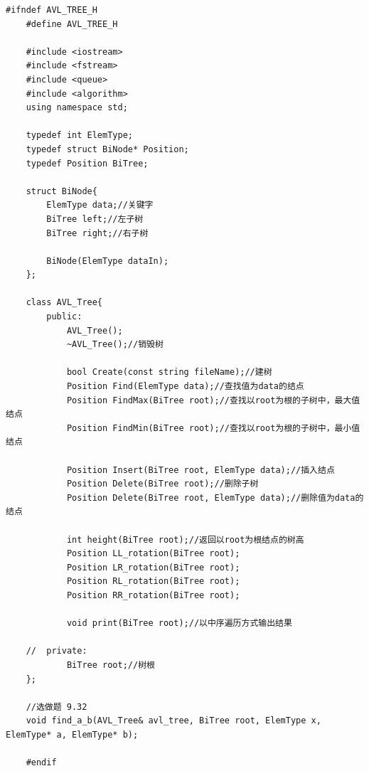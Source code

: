 \documentclass[a4paper,11pt,UTF8]{ctexart}
\begin{document}
\begin{lstlisting}[caption=avl\_tree.h,captionpos=b]
    #ifndef AVL_TREE_H
    #define AVL_TREE_H

    #include <iostream>
    #include <fstream>
    #include <queue>
    #include <algorithm>
    using namespace std;

    typedef int ElemType;
    typedef struct BiNode* Position;
    typedef Position BiTree;

    struct BiNode{
        ElemType data;//关键字
        BiTree left;//左子树
        BiTree right;//右子树

        BiNode(ElemType dataIn);
    };

    class AVL_Tree{
        public:
            AVL_Tree();
            ~AVL_Tree();//销毁树

            bool Create(const string fileName);//建树
            Position Find(ElemType data);//查找值为data的结点
            Position FindMax(BiTree root);//查找以root为根的子树中，最大值结点
            Position FindMin(BiTree root);//查找以root为根的子树中，最小值结点

            Position Insert(BiTree root, ElemType data);//插入结点
            Position Delete(BiTree root);//删除子树
            Position Delete(BiTree root, ElemType data);//删除值为data的结点

            int height(BiTree root);//返回以root为根结点的树高
            Position LL_rotation(BiTree root);
            Position LR_rotation(BiTree root);
            Position RL_rotation(BiTree root);
            Position RR_rotation(BiTree root);

            void print(BiTree root);//以中序遍历方式输出结果

    //	private:
            BiTree root;//树根
    };

    //选做题 9.32
    void find_a_b(AVL_Tree& avl_tree, BiTree root, ElemType x, ElemType* a, ElemType* b);

    #endif
\end{lstlisting}
\end{document}
